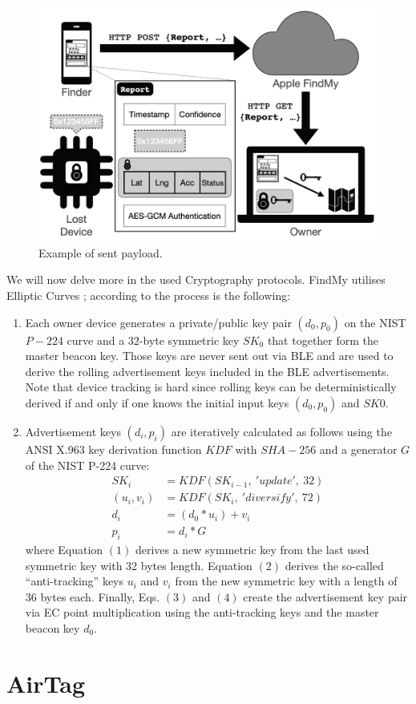 \documentclass[english]{article}
\begin{document}
\begin{figure}[]
	\centering
	\includegraphics[width=.9\textwidth]{images/findmysec.png}
	\caption{Example of sent payload.}
	\label{findmy}
\end{figure}

We will now delve more in the used Cryptography protocols. FindMy utilises Elliptic Curves \cite{ec}; according to \cite{aps,whocanfind} the process is the following:
\begin{enumerate}
  \item Each owner device generates a private/public key pair
  $(d_0, p_0)$ on the NIST $P-224$ curve and a $32$-byte symmetric key $SK_0$ that together form the master beacon key. Those keys are never sent out via BLE and are used to derive the rolling advertisement keys included in the BLE advertisements. Note that device tracking is hard since rolling keys can be deterministically derived if and only if one knows the initial input keys $(d_0, p_0)$ and $SK0$.
  \item Advertisement keys $(d_i,p_i)$ are iteratively calculated as follows using the ANSI X.963 key derivation function $KDF$ \cite{ANSI} with $SHA-256$ \cite{sha} and a generator $G$ of the NIST P-224 curve:
  \begin{align}
    SK_i &= KDF(SK_{i-1},\ 'update',\ 32) \\
    (u_i, v_i) &= KDF(SK_i,\ 'diversify',\ 72) \\
    d_i &= (d_0 * u_i) + v_i \\
    p_i &= d_i * G
  \end{align}
  where Equation $(1)$ derives a new symmetric key from the last used symmetric key with 32 bytes length. Equation $(2)$ derives the so-called “anti-tracking” keys $u_i$ and $v_i$ from the new symmetric key with a length of $36$ bytes each. Finally, Eqs. $(3)$ and $(4)$ create the advertisement key pair via EC point multiplication using the anti-tracking keys and the master beacon key $d_0$.
\end{enumerate}

\section{AirTag}\label{sec:at}

\printbibliography
\nocite{*}
\end{document}
